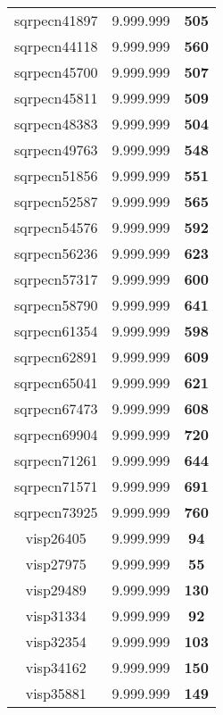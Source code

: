 \begin{tabular}{cc||c}
sqrpecn41897     & 9.999.999        & {\bf 505}       \\ 
sqrpecn44118     & 9.999.999        & {\bf 560}       \\ 
sqrpecn45700     & 9.999.999        & {\bf 507}       \\ 
sqrpecn45811     & 9.999.999        & {\bf 509}       \\ 
sqrpecn48383     & 9.999.999        & {\bf 504}       \\ 
sqrpecn49763     & 9.999.999        & {\bf 548}       \\ 
sqrpecn51856     & 9.999.999        & {\bf 551}       \\ 
sqrpecn52587     & 9.999.999        & {\bf 565}       \\ 
sqrpecn54576     & 9.999.999        & {\bf 592}       \\ 
sqrpecn56236     & 9.999.999        & {\bf 623}       \\ 
sqrpecn57317     & 9.999.999        & {\bf 600}       \\ 
sqrpecn58790     & 9.999.999        & {\bf 641}       \\ 
sqrpecn61354     & 9.999.999        & {\bf 598}       \\ 
sqrpecn62891     & 9.999.999        & {\bf 609}       \\ 
sqrpecn65041     & 9.999.999        & {\bf 621}       \\ 
sqrpecn67473     & 9.999.999        & {\bf 608}       \\ 
sqrpecn69904     & 9.999.999        & {\bf 720}       \\ 
sqrpecn71261     & 9.999.999        & {\bf 644}       \\ 
sqrpecn71571     & 9.999.999        & {\bf 691}       \\ 
sqrpecn73925     & 9.999.999        & {\bf 760}       \\ 
visp26405        & 9.999.999        & {\bf 94}        \\ 
visp27975        & 9.999.999        & {\bf 55}        \\ 
visp29489        & 9.999.999        & {\bf 130}       \\ 
visp31334        & 9.999.999        & {\bf 92}        \\ 
visp32354        & 9.999.999        & {\bf 103}       \\ 
visp34162        & 9.999.999        & {\bf 150}       \\ 
visp35881        & 9.999.999        & {\bf 149}       \\ 

\end{tabular}
